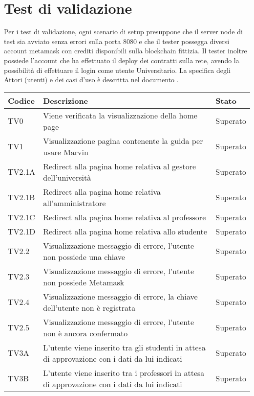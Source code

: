 \documentclass[PianoDiQualifica.tex]{subfiles}
\begin{document}
\chapter{Test di validazione}

Per i test di validazione, ogni scenario di setup presuppone che il server node di test sia avviato senza errori sulla porta 8080 e che il tester possegga diversi account metamask con crediti disponibili sulla blockchain fittizia.
Il tester inoltre possiede l’account che ha effettuato il deploy dei contratti sulla rete, avendo la possibilità di effettuare il login come utente Universitario.
La specifica degli Attori (utenti) e dei casi d’uso è descritta nel documento \adr \vrquattro.

\begin{longtable}[H]{P{2cm}P{8.5cm}P{3cm}}
	\color{CHeaderText}\textbf{Codice} & 
	\color{CHeaderText}\textbf{Descrizione} & 
	\color{CHeaderText}\textbf{Stato}\\
	\endhead
	TV0 & Viene verificata la visualizzazione della home page & Superato \\
	TV1 & Visualizzazione pagina contenente la guida per usare Marvin & Superato \\
	TV2.1A & Redirect alla pagina home relativa al gestore dell'università & Superato \\
	TV2.1B & Redirect alla pagina home relativa all'amministratore & Superato \\
	TV2.1C & Redirect alla pagina home relativa al professore & Superato \\
	TV2.1D & Redirect alla pagina home relativa allo studente & Superato \\
	TV2.2 & Visualizzazione messaggio di errore, l'utente non possiede una chiave & Superato \\ 
	TV2.3 & Visualizzazione messaggio di errore, l'utente non possiede Metamask & Superato \\ 
	TV2.4 & Visualizzazione messaggio di errore, la chiave dell'utente non è registrata & Superato \\ 
	TV2.5 & Visualizzazione messaggio di errore, l'utente non è ancora confermato & Superato \\ 
	TV3A & L'utente viene inserito tra gli studenti in attesa di approvazione con i dati da lui indicati & Superato \\ 
	TV3B & L'utente viene inserito tra i professori in attesa di approvazione con i dati da lui indicati & Superato \\ 

\end{longtable}
\end{document}
